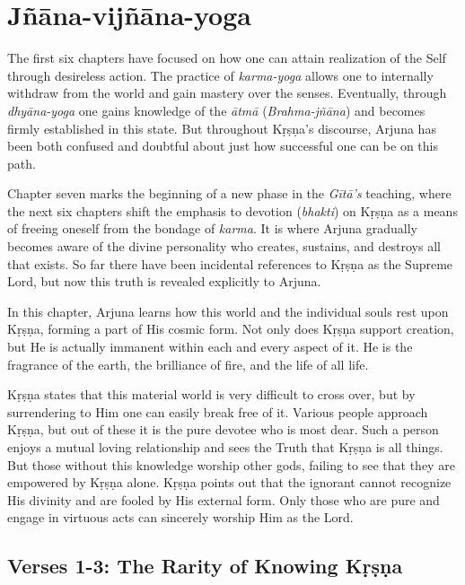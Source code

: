 \chapter{Jñāna-vijñāna-yoga}\label{chap-jnana-vijnana-yoga}

\noindent The first six chapters have focused on how one can attain realization of the Self through desireless action. The practice of \textit{karma-yoga} allows one to internally withdraw from the world and gain mastery over the senses. Eventually, through \textit{dhyāna-yoga} one gains knowledge of the \textit{ātmā} (\textit{Brahma-jñāna}) and becomes firmly established in this state. But throughout Kṛṣṇa's discourse, Arjuna has been both confused and doubtful about just how successful one can be on this path.

Chapter seven marks the beginning of a new phase in the \textit{Gītā’s} teaching, where the next six chapters shift the emphasis to devotion (\textit{bhakti}) on Kṛṣṇa as a means of freeing oneself from the bondage of \textit{karma}. It is where Arjuna gradually becomes aware of the divine personality who creates, sustains, and destroys all that exists. So far there have been incidental references to Kṛṣṇa as the Supreme Lord, but now this truth is revealed explicitly to Arjuna.

In this chapter, Arjuna learns how this world and the individual souls rest upon Kṛṣṇa, forming a part of His cosmic form. Not only does Kṛṣṇa support creation, but He is actually immanent within each and every aspect of it. He is the fragrance of the earth, the brilliance of fire, and the life of all life.

Kṛṣṇa states that this material world is very difficult to cross over, but by surrendering to Him one can easily break free of it. Various people approach Kṛṣṇa, but out of these it is the pure devotee who is most dear. Such a person enjoys a mutual loving relationship and sees the Truth that Kṛṣṇa is all things. But those without this knowledge worship other gods, failing to see that they are empowered by Kṛṣṇa alone. Kṛṣṇa points out that the ignorant cannot recognize His divinity and are fooled by His external form. Only those who are pure and engage in virtuous acts can sincerely worship Him as the Lord.

\section{Verses 1-3: The Rarity of Knowing Kṛṣṇa}\label{sec-verses-1-3-the-rarity-of-knowing-krsna}


